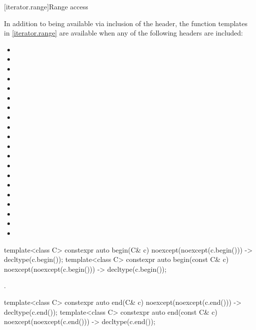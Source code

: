 [iterator.range]{Range access}

\pnum
In addition to being available via inclusion of the  header,
the function templates in \ref{iterator.range} are available when any of the following
headers are included:
\begin{itemize}
\item {}
\item {}
\item {}
\item {}
\item {}
\item {}
\item {}
\item {}
\item {}
\item {}
\item {}
\item {}
\item {}
\item {}
\item {}
\item {}
\item {}
\item {}
\item {}
\item {}
\end{itemize}

%
\begin{itemdecl}
template<class C> constexpr auto begin(C& c) noexcept(noexcept(c.begin()))
  -> decltype(c.begin());
template<class C> constexpr auto begin(const C& c) noexcept(noexcept(c.begin()))
  -> decltype(c.begin());
\end{itemdecl}

\begin{itemdescr}
\pnum
\returns
{}.
\end{itemdescr}

%
\begin{itemdecl}
template<class C> constexpr auto end(C& c) noexcept(noexcept(c.end())) -> decltype(c.end());
template<class C> constexpr auto end(const C& c) noexcept(noexcept(c.end())) -> decltype(c.end());
\end{itemdecl}

